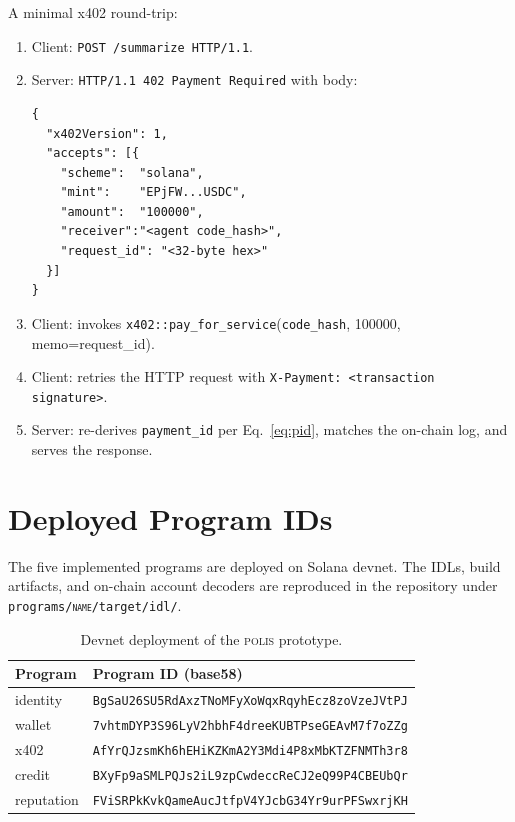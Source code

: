 \documentclass[10pt,conference,letterpaper]{IEEEtran}
\theoremstyle{definition}
\newcommand{\polis}{\textsc{polis}\xspace}
\newcommand{\codehash}{\texttt{code\_hash}}
\begin{document}
A minimal x402 round-trip:

\begin{enumerate}
\item Client: \texttt{POST /summarize HTTP/1.1}.
\item Server: \texttt{HTTP/1.1 402 Payment Required} with body:
\begin{lstlisting}
{
  "x402Version": 1,
  "accepts": [{
    "scheme":  "solana",
    "mint":    "EPjFW...USDC",
    "amount":  "100000",
    "receiver":"<agent code_hash>",
    "request_id": "<32-byte hex>"
  }]
}
\end{lstlisting}
\item Client: invokes \texttt{x402::pay\_for\_service}(\codehash, 100000,
memo=request\_id).
\item Client: retries the HTTP request with
\texttt{X-Payment: <transaction signature>}.
\item Server: re-derives \texttt{payment\_id} per Eq.~\ref{eq:pid},
matches the on-chain log, and serves the response.
\end{enumerate}

\section{Deployed Program IDs}\label{app:deployment}

The five implemented programs are deployed on Solana devnet. The IDLs,
build artifacts, and on-chain account decoders are reproduced in the
repository under \texttt{programs/\textsc{name}/target/idl/}.

\begin{table}[H]
\caption{Devnet deployment of the \polis prototype.}
\label{tab:deploy}
\centering
\small
\begin{tabularx}{\columnwidth}{lX}
\toprule
\textbf{Program} & \textbf{Program ID (base58)} \\
\midrule
identity   & \texttt{BgSaU26SU5RdAxzTNoMFyXoWqxRqyhEcz8zoVzeJVtPJ} \\
wallet     & \texttt{7vhtmDYP3S96LyV2hbhF4dreeKUBTPseGEAvM7f7oZZg} \\
x402       & \texttt{AfYrQJzsmKh6hEHiKZKmA2Y3Mdi4P8xMbKTZFNMTh3r8} \\
credit     & \texttt{BXyFp9aSMLPQJs2iL9zpCwdeccReCJ2eQ99P4CBEUbQr} \\
reputation & \texttt{FViSRPkKvkQameAucJtfpV4YJcbG34Yr9urPFSwxrjKH} \\
\bottomrule
\end{tabularx}
\end{table}
\end{document}
